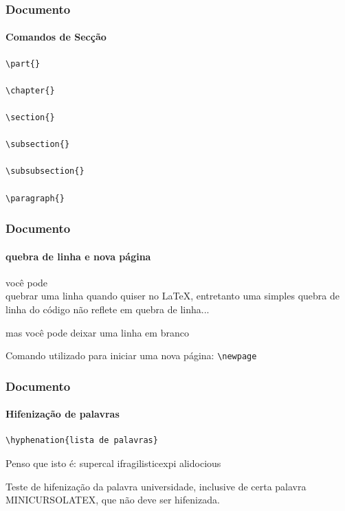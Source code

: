 \begin{frame}[fragile]
\frametitle{Documento}
\framesubtitle{Comandos de Secção}
  
\begin{verbatim}
\part{}

\chapter{}

\section{}

\subsection{}

\subsubsection{}

\paragraph{}
\end{verbatim}

\end{frame}



\begin{frame}[fragile]
\frametitle{Documento}
\framesubtitle{quebra de linha e nova página}
\begin{LTXexample}
  você pode \\ quebrar uma linha 
  quando quiser no \newline \LaTeX, 
  entretanto uma simples quebra
  de linha do código não reflete 
  em quebra de linha... 
  
  mas você pode deixar uma linha 
  em branco
\end{LTXexample}  
  Comando utilizado para iniciar uma nova página: \verb|\newpage|
\end{frame}


\begin{frame}[fragile]
\frametitle{Documento}
\framesubtitle{Hifenização de palavras}
  \begin{verbatim}
\hyphenation{lista de palavras}
  \end{verbatim}

\begin{LTXexample}
  Penso que isto é: su\-per\-cal\-%
  i\-frag\-i\-lis\-tic\-ex\-pi\-%
  al\-i\-do\-cious
  
  Teste de hifenização da palavra 
  universidade, inclusive de  
  certa  palavra MINICURSOLATEX, 
  que não deve ser hifenizada.
\end{LTXexample}
\end{frame}


